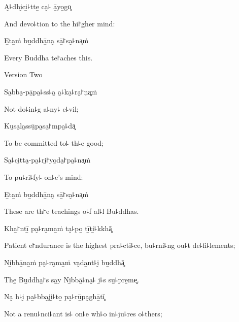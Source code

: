 A̮꜕dhi̮ci̱꜕tte̱ ca̮꜕ ā̱yo̱go͓

\begin{english}
  And devo꜕tion to the hi꜓gher mind:
\end{english}

E̱ta̱ṁ bu̱ddhā̱na̮ sā̱꜓sa̮꜕na͓ṁ

\begin{english}
  Every Buddha te꜓aches this.
\end{english}

\clearpage

\begin{instruction}
  Version Two
\end{instruction}


Sa̱bba̮-pā̱pa̱꜕ss꜕a̮ a̮꜕ka̮꜕ra̮꜓ṇa͓ṁ

\begin{english}
  Not do꜕in꜕g a꜕ny꜕ e꜕vil;
\end{english}

Ku̮sa̮la̱ssū̱pa̮sa̱꜓mpa̮꜕dā͓

\begin{english}
  To be committed to꜕ th꜕e good;
\end{english}

Sa̮꜕ci̱tta̮-pa̮꜕ri̮꜓yo̱da̮꜓pa̮꜕na͓ṁ

\begin{english}
  To pu꜕ri꜕fy꜕ on꜕e's mind:
\end{english}

E̱ta̱ṁ bu̱ddhā̱na̮ sā̱꜓sa̮꜕na͓ṁ

\begin{english}
  These are th꜓e teachings o꜕f al꜕l Bu꜕ddhas.
\end{english}

Kha̱꜓ntī̱ pa̮꜕ra̮ma̱ṁ ta̮꜕po̱ tī̱ti̱꜕kkhā͓

\begin{english}
  Patient e꜓ndurance is the highest pra꜕cti꜕ce, bu꜕rni꜕ng ou꜕t de꜕fi꜕lements;
\end{english}

Ni̱bbā̱na̱ṁ pa̮꜕ra̮ma̱ṁ va̮da̱nt꜕i̮ bu̱ddhā͓

\begin{english}
  The̱ Bu̱ddha̱꜓s sa̱y Ni̱bbā̱꜕na̮꜕ i̱꜕s su̱꜕pre̱me͓.
\end{english}

Na̮ h꜕i̮ pa̱꜕bba̮ji̮꜕to̱ pa̮꜕rū̱pa̮ghā̱tī͓

\begin{english}
  Not a renu꜕nci꜕ant is꜕ on꜕e wh꜕o in꜕ju꜕res o꜕thers;
\end{english}

